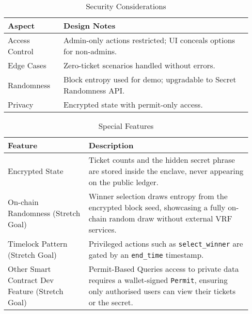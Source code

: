 \documentclass{article}
\begin{document}
\begin{table}[h]
  \centering
  \caption{Security Considerations}
  \label{tab:Security Considerations}
  \begin{tabular}{@{}lp{10cm}@{}}
    \toprule
    \textbf{Aspect} & \textbf{Design Notes} \\
    \midrule
    Access Control & Admin-only actions restricted; UI conceals options for non-admins. \\
    \midrule
    Edge Cases & Zero-ticket scenarios handled without errors. \\
    \midrule
    Randomness & Block entropy used for demo; upgradable to Secret Randomness API. \\
    \midrule
    Privacy & Encrypted state with permit-only access. \\
    \bottomrule
  \end{tabular}
\end{table}

\begin{table}[h]
  \centering
  \caption{Special Features}
  \label{tab:Special Features}
  \begin{tabularx}{\textwidth}{@{}lX@{}}
    \toprule
    \textbf{Feature} & \textbf{Description} \\
    \midrule
    Encrypted State & Ticket counts and the hidden secret phrase are stored inside the enclave, never appearing on the public ledger. \\
    \midrule
    On-chain Randomness (Stretch Goal) & Winner selection draws entropy from the encrypted block seed, showcasing a fully on-chain random draw without external VRF services. \\
    \midrule
    Timelock Pattern (Stretch Goal) & Privileged actions such as \texttt{select\_winner} are gated by an \texttt{end\_time} timestamp. \\
    \midrule
    Other Smart Contract Dev Feature (Stretch Goal) & Permit-Based Queries access to private data requires a wallet-signed \texttt{Permit}, ensuring only authorised users can view their tickets or the secret. \\
    \bottomrule
  \end{tabularx}
\end{table}

\newpage

\end{document}
